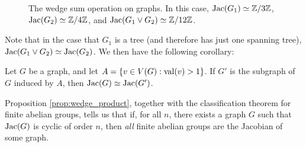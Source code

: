 \documentclass{amsart}
\begin{document}
\begin{figure}[h]
  \caption{The wedge sum operation on graphs. In this case, $\operatorname{Jac}(G_1)
  \simeq \mathbb{Z}/3\mathbb{Z}$, $\operatorname{Jac}(G_2) \simeq \mathbb{Z}/4\mathbb{Z}$, and $\operatorname{Jac}(G_1 \vee G_2)
  \simeq \mathbb{Z}/12\mathbb{Z}$.}
\end{figure}

Note that in the case that $G_1$ is a tree (and therefore has just one
spanning tree), $\operatorname{Jac}(G_1 \vee G_2) \simeq \operatorname{Jac}(G_2)$. We then have
the following corollary:
\begin{cor}
  \label{cor:1_valent}
  Let $G$ be a graph, and let $A = \{v \in V(G) : \operatorname{val}(v) > 1\}$. If
  $G'$ is the subgraph of $G$ induced by $A$, then $\operatorname{Jac}(G) \simeq
  \operatorname{Jac}(G')$.
\end{cor}

Proposition \ref{prop:wedge_product}, together with the classification
theorem for finite abelian groups, tells us that if, for all $n$,
there exists a graph $G$ such that $\operatorname{Jac}(G)$ is cyclic of order $n$,
then \emph{all} finite abelian groups are the Jacobian of some graph.
\end{document}
